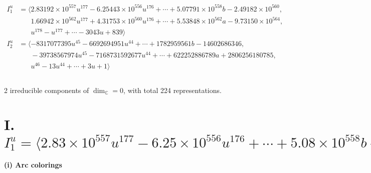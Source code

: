 \documentclass[1p]{elsarticle_modified}
\theoremstyle{definition}
\begin{document}
\begin{align*}
I^u_{1}&=\langle 
2.83192\times10^{557} u^{177}-6.25443\times10^{556} u^{176}+\cdots+5.07791\times10^{558} b-2.49182\times10^{560},\\
\phantom{I^u_{1}}&\phantom{= \langle  }1.66942\times10^{562} u^{177}+4.31753\times10^{560} u^{176}+\cdots+5.53848\times10^{562} a-9.73150\times10^{564},\\
\phantom{I^u_{1}}&\phantom{= \langle  }u^{178}- u^{177}+\cdots-3043 u+839\rangle \\
I^u_{2}&=\langle 
-8317077395 u^{45}-6692694951 u^{44}+\cdots+1782959561 b-14602686346,\\
\phantom{I^u_{2}}&\phantom{= \langle  }-39738567974 u^{45}-7168731592677 u^{44}+\cdots+622252886789 a+2806256180785,\\
\phantom{I^u_{2}}&\phantom{= \langle  }u^{46}-13 u^{44}+\cdots+3 u+1\rangle \\
\\
\end{align*}
\raggedright * 2 irreducible components of $\dim_{\mathbb{C}}=0$, with total 224 representations.\\
\newpage
\renewcommand{\arraystretch}{1}
\centering \section*{I. $I^u_{1}= \langle 2.83\times10^{557} u^{177}-6.25\times10^{556} u^{176}+\cdots+5.08\times10^{558} b-2.49\times10^{560},\;1.67\times10^{562} u^{177}+4.32\times10^{560} u^{176}+\cdots+5.54\times10^{562} a-9.73\times10^{564},\;u^{178}- u^{177}+\cdots-3043 u+839 \rangle$}
\flushleft \textbf{(i) Arc colorings}\\
\end{document}
